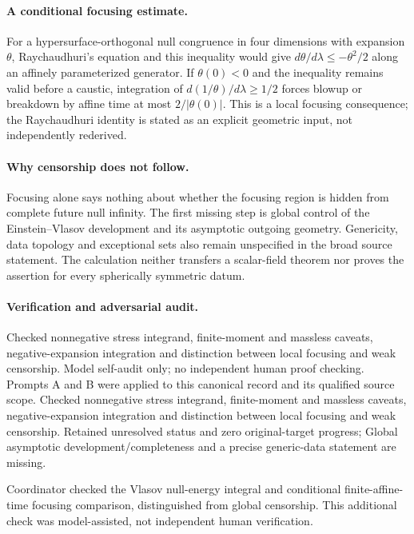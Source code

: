 \documentclass[11pt]{article}
\begin{document}
\paragraph{A conditional focusing estimate.} For a hypersurface-orthogonal null congruence in four dimensions with expansion $\theta$, Raychaudhuri's equation and this inequality would give $d\theta/d\lambda\leq-\theta^2/2$ along an affinely parameterized generator. If $\theta(0)<0$ and the inequality remains valid before a caustic, integration of $d(1/\theta)/d\lambda\geq1/2$ forces blowup or breakdown by affine time at most $2/|\theta(0)|$. This is a local focusing consequence; the Raychaudhuri identity is stated as an explicit geometric input, not independently rederived.

\paragraph{Why censorship does not follow.} Focusing alone says nothing about whether the focusing region is hidden from complete future null infinity. The first missing step is global control of the Einstein--Vlasov development and its asymptotic outgoing geometry. Genericity, data topology and exceptional sets also remain unspecified in the broad source statement. The calculation neither transfers a scalar-field theorem nor proves the assertion for every spherically symmetric datum.

\paragraph{Verification and adversarial audit.}
Checked nonnegative stress integrand, finite-moment and massless caveats, negative-expansion integration and distinction between local focusing and weak censorship. Model self-audit only; no independent human proof checking. Prompts A and B were applied to this canonical record and its qualified source scope. Checked nonnegative stress integrand, finite-moment and massless caveats, negative-expansion integration and distinction between local focusing and weak censorship. Retained unresolved status and zero original-target progress; Global asymptotic development/completeness and a precise generic-data statement are missing.

Coordinator checked the Vlasov null-energy integral and conditional finite-affine-time focusing comparison, distinguished from global censorship. This additional check was model-assisted, not independent human verification.
\end{document}
